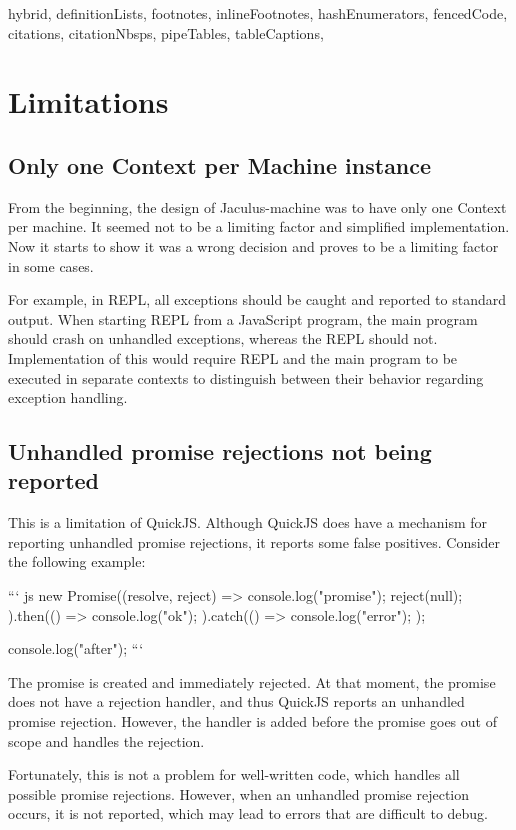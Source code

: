 \begin{markdown*}{%
  hybrid,
  definitionLists,
  footnotes,
  inlineFootnotes,
  hashEnumerators,
  fencedCode,
  citations,
  citationNbsps,
  pipeTables,
  tableCaptions,
}

\chapter{Limitations}

\section{Only one Context per Machine instance}

From the beginning, the design of Jaculus-machine was to have only one Context per machine. It seemed not to be a limiting factor and simplified implementation. Now it starts to show it was a wrong decision and proves to be a limiting factor in some cases.

For example, in REPL, all exceptions should be caught and reported to standard output. When starting REPL from a JavaScript program, the main program should crash on unhandled exceptions, whereas the REPL should not. Implementation of this would require REPL and the main program to be executed in separate contexts to distinguish between their behavior regarding exception handling.


\section{Unhandled promise rejections not being reported}

This is a limitation of QuickJS. Although QuickJS does have a mechanism for reporting unhandled promise rejections, it reports some false positives. Consider the following example:

``` js
new Promise((resolve, reject) => {
    console.log("promise");
    reject(null);
}).then(() => {
    console.log("ok");
}).catch(() => {
    console.log("error");
});

console.log("after");
```

The promise is created and immediately rejected. At that moment, the promise does not have a rejection handler, and thus QuickJS reports an unhandled promise rejection. However, the handler is added before the promise goes out of scope and handles the rejection.

Fortunately, this is not a problem for well-written code, which handles all possible promise rejections. However, when an unhandled promise rejection occurs, it is not reported, which may lead to errors that are difficult to debug.


\end{markdown*}
